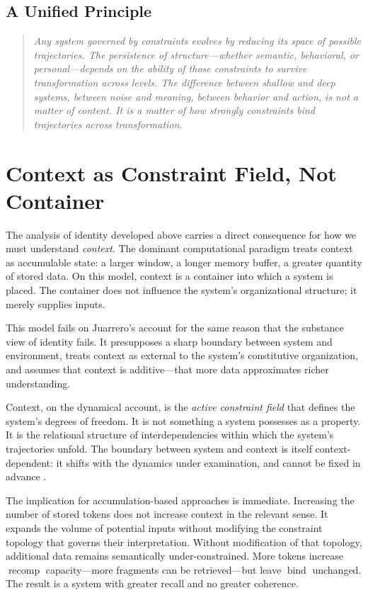 \documentclass[11pt]{article}
\newcommand{\bind}{\operatorname{bind}}
\newcommand{\recomp}{\operatorname{recomp}}
\begin{document}
\subsection{A Unified Principle}

\begin{quote}
\itshape
Any system governed by constraints evolves by reducing its space of possible trajectories.
The persistence of structure---whether semantic, behavioral, or personal---depends on the
ability of those constraints to survive transformation across levels. The difference
between shallow and deep systems, between noise and meaning, between behavior and action,
is not a matter of content. It is a matter of how strongly constraints bind trajectories
across transformation.
\end{quote}

\section{Context as Constraint Field, Not Container}

The analysis of identity developed above carries a direct consequence for how we must
understand \emph{context}. The dominant computational paradigm treats context as
accumulable state: a larger window, a longer memory buffer, a greater quantity of stored
data. On this model, context is a container into which a system is placed. The container
does not influence the system's organizational structure; it merely supplies inputs.

This model fails on Juarrero's account for the same reason that the substance view of
identity fails. It presupposes a sharp boundary between system and environment, treats
context as external to the system's constitutive organization, and assumes that
context is additive---that more data approximates richer understanding.

Context, on the dynamical account, is the \emph{active constraint field} that defines
the system's degrees of freedom. It is not something a system possesses as a property.
It is the relational structure of interdependencies within which the system's trajectories
unfold. The boundary between system and context is itself context-dependent: it shifts
with the dynamics under examination, and cannot be fixed in advance \citep{clark1997,varela1991}.

The implication for accumulation-based approaches is immediate. Increasing the number of
stored tokens does not increase context in the relevant sense. It expands the volume of
potential inputs without modifying the constraint topology that governs their interpretation.
Without modification of that topology, additional data remains semantically under-constrained.
More tokens increase $\recomp$ capacity---more fragments can be retrieved---but leave $\bind$
unchanged. The result is a system with greater recall and no greater coherence.
\end{document}
